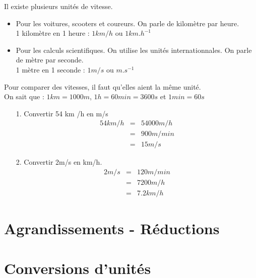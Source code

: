 \documentclass[paper=a4, fontsize=9pt]{scrartcl} %
\begin{document}
Il existe plusieurs unités de vitesse. 

\begin{itemize}
\item Pour les voitures, scooters et coureurs. On parle de kilomètre par heure.\\
  1 kilomètre en 1 heure : $1km/h$ ou $1km.h^{-1}$
\item Pour les calculs scientifiques. On utilise les unités internationnales. On parle de mètre par seconde.\\
  1 mètre en 1 seconde   : $1m/s$  ou $m.s^{-1}$ 
\end{itemize}

Pour comparer des vitesses, il faut qu'elles aient la même unité. \\On sait que : $1km = 1000m$, $1h = 60min = 3600s$ et $1min = 60s$

\begin{multicols}{2}
  \begin{enumerate}
  \item[1.] Convertir 54 km /h en m/s
    \begin{eqnarray*}
      54 km /h &=& 54 000 m/h\\
      &=& 900 m/min\\
      &=& 15 m/s
    \end{eqnarray*}

  \item[2.] Convertir 2m/s en km/h.
    \begin{eqnarray*}
      2 m /s &=& 120  m /min\\
      &=& 7200 m /h\\
      &=& 7.2 km /h
    \end{eqnarray*}
  \end{enumerate}
\end{multicols}

\section{Agrandissements - Réductions}
\section{Conversions d'unités}
\end{document}

